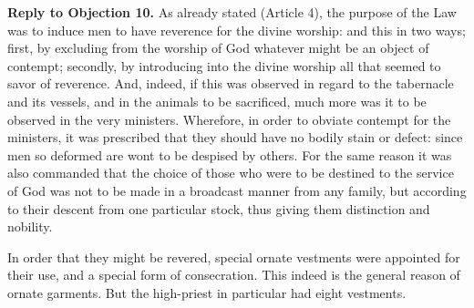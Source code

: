 \textbf{Reply to Objection 10.} As already stated (Article 4), the purpose of the Law was to induce men to have reverence for the divine worship: and this in two ways; first, by excluding from the worship of God whatever might be an object of contempt; secondly, by introducing into the divine worship all that seemed to savor of reverence. And, indeed, if this was observed in regard to the tabernacle and its vessels, and in the animals to be sacrificed, much more was it to be observed in the very ministers. Wherefore, in order to obviate contempt for the ministers, it was prescribed that they should have no bodily stain or defect: since men so deformed are wont to be despised by others. For the same reason it was also commanded that the choice of those who were to be destined to the service of God was not to be made in a broadcast manner from any family, but according to their descent from one particular stock, thus giving them distinction and nobility.

In order that they might be revered, special ornate vestments were appointed for their use, and a special form of consecration. This indeed is the general reason of ornate garments. But the high-priest in particular had eight vestments.

